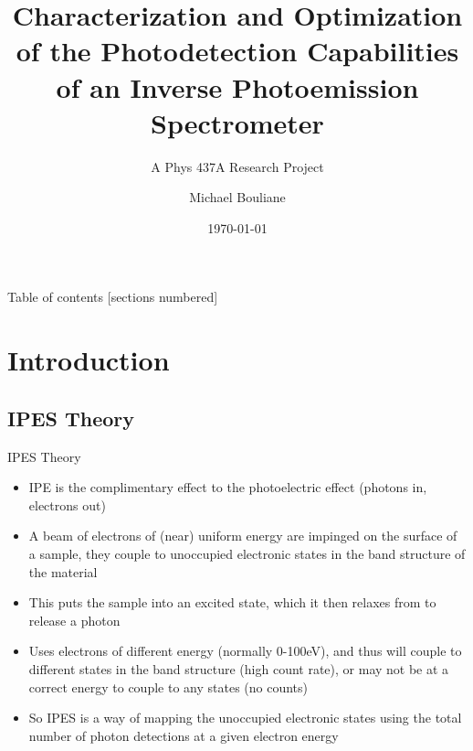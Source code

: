\documentclass[12pt, aspectratio=169]{beamer}
\title{Characterization and Optimization of the Photodetection Capabilities of an Inverse Photoemission Spectrometer}
\subtitle{A Phys 437A Research Project}
\date{\today}
\author{Michael Bouliane}
\institute{University of Waterloo}
\begin{document}
\maketitle

\begin{frame}{Table of contents}
    [sections numbered]
    \tableofcontents%
  \end{frame}

\section{Introduction}

\subsection{IPES Theory}
\begin{frame}{IPES Theory}
    \begin{itemize}
        \item IPE is the complimentary effect to the photoelectric effect (photons in, electrons out)
        \item A beam of electrons of (near) uniform energy are impinged on the surface of a sample, they couple to unoccupied electronic states in the band structure of the material
        \item This puts the sample into an excited state, which it then relaxes from to release a photon
        \item Uses electrons of different energy (normally 0-100eV), and thus will couple to different states in the band structure (high count rate), or may not be at a correct energy to
        couple to any states (no counts)
        \item So IPES is a way of mapping the unoccupied electronic states using the total number of photon detections at a given electron energy
    \end{itemize}
\end{frame}
\end{document}
